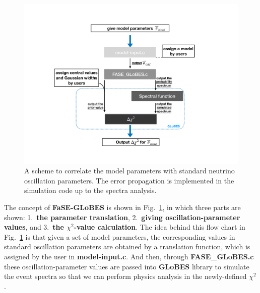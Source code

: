 \documentclass[aps,prd,nofootinbib,preprint]{revtex4}
\begin{document}
\begin{figure}[!h]%
\centering
\includegraphics[width=7.5in]{Figs/FASE-chart_1_2.pdf}
\caption{A scheme to correlate the model parameters with standard neutrino oscillation parameters. The error propagation is implemented in the simulation code up to the spectra analysis.}%
\label{fig:FASE}
\end{figure}


The concept of \textbf{FaSE-GLoBES} is shown in Fig.~\ref{fig:FASE}, in which three parts are shown: 1.~\textbf{the parameter translation}, 2.~\textbf{giving oscillation-parameter values}, and 3.~\textbf{the $\chi^2$-value calculation}. 
The idea behind this flow chart in Fig.~\ref{fig:FASE} is that given a set of model parameters, the corresponding values in standard oscillation parameters are obtained by a translation function, which is assigned by the user in \textbf{model-input.c}. And then, through \textbf{FASE\_GLoBES.c} these oscillation-parameter values are passed into \textbf{GLoBES} library to simulate the event spectra so that we can perform physics analysis in the newly-defined $\chi^2$. 
\end{document}
